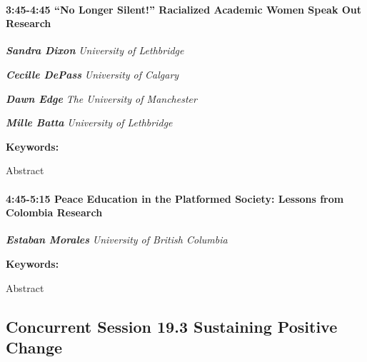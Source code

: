 \documentclass[
]{book}
\begin{document}
\begin{session}
\hypertarget{no-longer-silent-racialized-academic-women-speak-out-research}{%
\paragraph*{\texorpdfstring{3:45-4:45 \textbar{} \textbf{``No Longer
Silent!'' Racialized Academic Women Speak Out} \textbar{}
Research}{3:45-4:45 \textbar{} ``No Longer Silent!'' Racialized Academic Women Speak Out \textbar{} Research}}\label{no-longer-silent-racialized-academic-women-speak-out-research}}

\textbf{\emph{Sandra Dixon}} \textbar{} \emph{University of Lethbridge}

\textbf{\emph{Cecille DePass}} \textbar{} \emph{University of Calgary}

\textbf{\emph{Dawn Edge}} \textbar{} \emph{The University of Manchester}

\textbf{\emph{Mille Batta}} \textbar{} \emph{University of Lethbridge}

\textbf{Keywords:}

Abstract
\end{session}

\begin{session}
\hypertarget{peace-education-in-the-platformed-society-lessons-from-colombia-research}{%
\paragraph*{\texorpdfstring{4:45-5:15 \textbar{} \textbf{Peace Education
in the Platformed Society: Lessons from Colombia} \textbar{}
Research}{4:45-5:15 \textbar{} Peace Education in the Platformed Society: Lessons from Colombia \textbar{} Research}}\label{peace-education-in-the-platformed-society-lessons-from-colombia-research}}

\textbf{\emph{Estaban Morales}} \textbar{} \emph{University of British
Columbia}

\textbf{Keywords:}

Abstract
\end{session}

\hypertarget{concurrent-session-19.3-sustaining-positive-change}{%
\subsection*{Concurrent Session 19.3 \textbar{} Sustaining Positive Change}\label{concurrent-session-19.3-sustaining-positive-change}}
\end{document}
